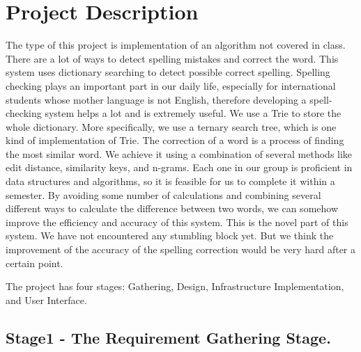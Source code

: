 \documentclass[10pt,conference]{IEEEtran}
\begin{document}
\section{Project Description}\label{sec:1. Project Description}
\textnormal{
	The type of this project is implementation of an algorithm not covered in class.
 There are a lot of ways to detect spelling mistakes and correct the word. This system uses dictionary searching to detect possible correct spelling. Spelling checking plays an important part in our daily life, especially for international students whose mother language is not English, therefore developing a spell-checking system helps a lot and is extremely useful. 
We use a Trie to store the whole dictionary. More specifically, we use a ternary search tree, which is one kind of implementation of Trie. The correction of a word is a process of finding the most similar word. We achieve it using a combination of several methods like edit distance, similarity keys, and n-grams. Each one in our group is proficient in data structures and algorithms, so it is feasible for us to complete it within a semester. 
By avoiding some number of calculations and combining several different ways to calculate the difference between two words, we can somehow improve the efficiency and accuracy of this system. This is the novel part of this system.
We have not encountered any stumbling block yet. But we think the improvement of the accuracy of the spelling correction would be very hard after a certain point.
}

The project has four stages: Gathering, Design, Infrastructure Implementation, and User Interface.

%
\subsection{Stage1 - The Requirement Gathering Stage. }\label{sec:1 Requirement Gathering Stage. }

\end{document}
